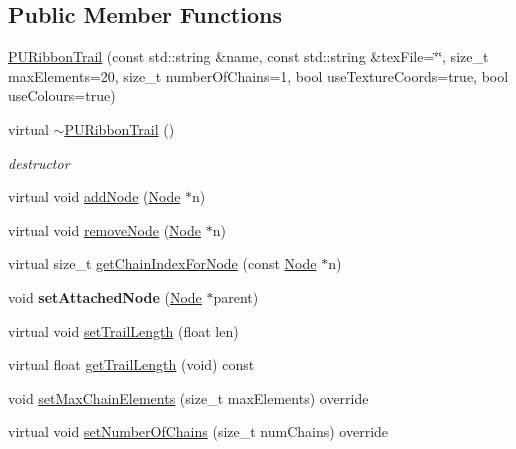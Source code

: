 \subsection*{Public Member Functions}
\begin{DoxyCompactItemize}
\item 
\hyperlink{classPURibbonTrail_a9cf6152a0b0a57b2ebd40108d4b60647}{P\+U\+Ribbon\+Trail} (const std\+::string \&name, const std\+::string \&tex\+File=\char`\"{}\char`\"{}, size\+\_\+t max\+Elements=20, size\+\_\+t number\+Of\+Chains=1, bool use\+Texture\+Coords=true, bool use\+Colours=true)
\item 
\mbox{\label{classPURibbonTrail_a182c68d0f3d519787f73a9852c5fe9a4}} 
virtual \hyperlink{classPURibbonTrail_a182c68d0f3d519787f73a9852c5fe9a4}{$\sim$\+P\+U\+Ribbon\+Trail} ()
\begin{DoxyCompactList}\small\item\em destructor \end{DoxyCompactList}\item 
virtual void \hyperlink{classPURibbonTrail_a9220a9096a518fb57cf064767d804a79}{add\+Node} (\hyperlink{classNode}{Node} $\ast$n)
\item 
virtual void \hyperlink{classPURibbonTrail_abcb0fb34b7cda45a2180285d4903e4fc}{remove\+Node} (\hyperlink{classNode}{Node} $\ast$n)
\item 
virtual size\+\_\+t \hyperlink{classPURibbonTrail_a570003f3cf26fbf9977d2d402705325f}{get\+Chain\+Index\+For\+Node} (const \hyperlink{classNode}{Node} $\ast$n)
\item 
\mbox{\label{classPURibbonTrail_a925a8af6ebe70c26a3d0b694ed04ce73}} 
void {\bfseries set\+Attached\+Node} (\hyperlink{classNode}{Node} $\ast$parent)
\item 
virtual void \hyperlink{classPURibbonTrail_a48529874c9823d5b2bd38fddd8aaeced}{set\+Trail\+Length} (float len)
\item 
virtual float \hyperlink{classPURibbonTrail_a1c63f6dcfb5ac3dcd9fc0abb2098e074}{get\+Trail\+Length} (void) const
\item 
void \hyperlink{classPURibbonTrail_af755423a7832221d273b9e2daae26dbe}{set\+Max\+Chain\+Elements} (size\+\_\+t max\+Elements) override
\item 
virtual void \hyperlink{classPURibbonTrail_a73dff6c67263bc49678ce73a16d03756}{set\+Number\+Of\+Chains} (size\+\_\+t num\+Chains) override
\item 

\end{DoxyCompactItemize}

